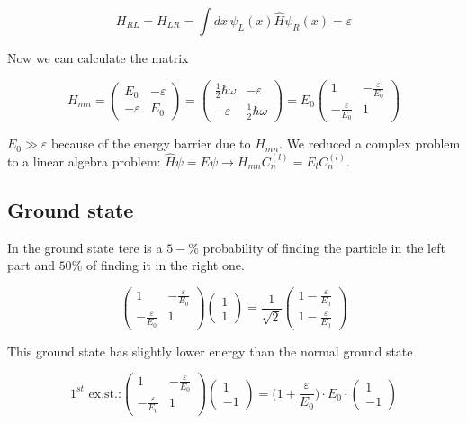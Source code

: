 $$H_{RL}=H_{LR}=\int dx\,\psi_L(x)\hat{H}\psi_R(x) = \varepsilon$$

Now we can calculate the matrix

$$H_{mn}=\begin{pmatrix}E_0 & -\varepsilon\\-\varepsilon & E_0\end{pmatrix}=\begin{pmatrix}\frac{1}{2}\hbar\omega & -\varepsilon\\-\varepsilon & \frac{1}{2}\hbar\omega\end{pmatrix}=E_0\begin{pmatrix}1 & -\frac{\varepsilon}{E_0}\\-\frac{\varepsilon}{E_0} & 1\end{pmatrix}$$

$E_0\gg \varepsilon$ because of the energy barrier due to $H_{mn}$.
We reduced a complex problem to a linear algebra problem: $\hat{H}\psi=E\psi \rightarrow H_{mn}C_n^{(l)}=E_lC_n^{(l)}$.

	\subsection{Ground state}
	In the ground state tere is a $5-\%$ probability of finding the particle in the left part and $50\%$ of finding it in the right one.

$$\begin{pmatrix}1 & -\frac{\varepsilon}{E_0}\\-\frac{\varepsilon}{E_0} & 1\end{pmatrix}\begin{pmatrix}1\\1\end{pmatrix}=\frac{1}{\sqrt{2}}\begin{pmatrix}1-\frac{\varepsilon}{E_0}\\1-\frac{\varepsilon}{E_0}\end{pmatrix}$$

This ground state has slightly lower energy than the normal ground state

$$1^{st}\text{ ex.st.:}\begin{pmatrix}1 & -\frac{\varepsilon}{E_0}\\-\frac{\varepsilon}{E_0} & 1\end{pmatrix}\begin{pmatrix}1\\-1\end{pmatrix}=\biggl(1+\frac{\varepsilon}{E_0}\biggr)\cdot E_0 \cdot\begin{pmatrix}1\\-1\end{pmatrix}$$


